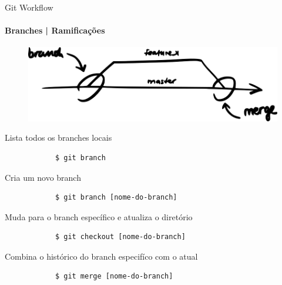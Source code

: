 \documentclass[xcolor=dvipsnames,t]{beamer}
\begin{document}
\begin{frame}[fragile]{Git Workflow}
\framesubtitle{Branches | Ramificações}
	\begin{figure}
		\centering			
		\includegraphics[width=0.6\linewidth]{figures/branchesv2}
	\end{figure}

	\begin{block}{Lista todos os branches locais}		
		\begin{verbatim}
			$ git branch
		\end{verbatim}
	\end{block}			

	\begin{block}{Cria um novo branch}		
		\begin{verbatim}
			$ git branch [nome-do-branch]
		\end{verbatim}
	\end{block}			

	\begin{block}{Muda para o branch específico e atualiza o diretório}		
		\begin{verbatim}
			$ git checkout [nome-do-branch]
		\end{verbatim}
	\end{block}			

	\begin{block}{Combina o histórico do branch especifíco com o atual}		
		\begin{verbatim}
			$ git merge [nome-do-branch]
		\end{verbatim}
	\end{block}			

	\end{frame}
\end{document}
